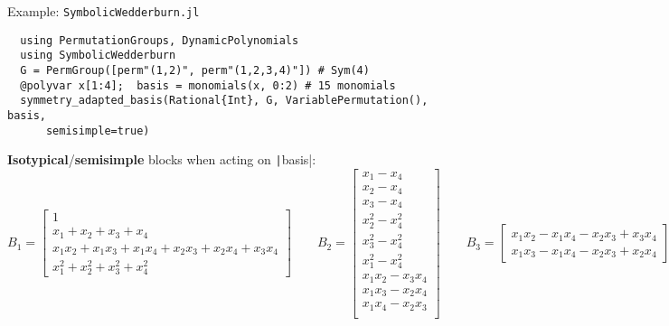\begin{frame}[fragile]{Example: {\texttt{SymbolicWedderburn.jl}}}
\small
\begin{verbatim}
  using PermutationGroups, DynamicPolynomials
  using SymbolicWedderburn
  G = PermGroup([perm"(1,2)", perm"(1,2,3,4)"]) # Sym(4)
  @polyvar x[1:4];  basis = monomials(x, 0:2) # 15 monomials
  symmetry_adapted_basis(Rational{Int}, G, VariablePermutation(), basis, 
      semisimple=true)
\end{verbatim}
\normalsize
\textbf{Isotypical}/\textbf{semisimple} blocks when acting on \texttt|basis|:
\tiny
\[
  B_1 = \begin{bmatrix}
          1\\
          x_1 + x_2 + x_3 + x_4\\
          x_{1}x_{2} + x_{1}x_{3} + x_{1}x_{4} + x_{2}x_{3} + x_{2}x_{4} + x_{3}x_{4}\\
          x_{1}^{2} + x_{2}^{2} + x_{3}^{2} + x_{4}^{2}
        \end{bmatrix}
  \qquad
  B_2 = \begin{bmatrix}
        x_{1} - x_{4}\\
        x_{2} - x_{4}\\
        x_{3} - x_{4}\\
        x_{2}^{2} - x_{4}^{2}\\
        x_{3}^{2} - x_{4}^{2}\\
        x_{1}^{2} - x_{4}^{2}\\
        x_{1}x_{2} - x_{3}x_{4}\\
        x_{1}x_{3} - x_{2}x_{4}\\
        x_{1}x_{4} - x_{2}x_{3}\\
        \end{bmatrix}
  \qquad
  B_3 = \begin{bmatrix}
        x_{1}x_{2} - x_{1}x_{4} - x_{2}x_{3} + x_{3}x_{4}\\
        x_{1}x_{3} - x_{1}x_{4} - x_{2}x_{3} + x_{2}x_{4}
        \end{bmatrix}
\]

\end{frame}

